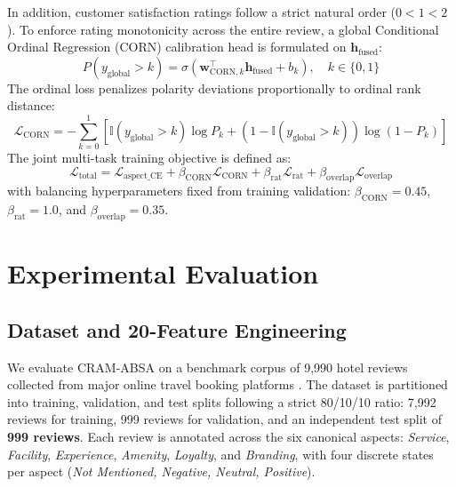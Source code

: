 \documentclass{llncs}
\begin{document}
In addition, customer satisfaction ratings follow a strict natural order ($0 < 1 < 2$). To enforce rating monotonicity across the entire review, a global Conditional Ordinal Regression (CORN) calibration head is formulated on $\mathbf{h}_{\text{fused}}$:
\begin{equation}
P(y_{\text{global}} > k) = \sigma(\mathbf{w}_{\text{CORN}, k}^\top \mathbf{h}_{\text{fused}} + b_k), \quad k \in \{0, 1\}
\end{equation}
The ordinal loss penalizes polarity deviations proportionally to ordinal rank distance:
\begin{equation}
\mathcal{L}_{\text{CORN}} = - \sum_{k=0}^{1} \left[ \mathbb{I}(y_{\text{global}} > k) \log P_k + (1 - \mathbb{I}(y_{\text{global}} > k)) \log (1 - P_k) \right]
\end{equation}
The joint multi-task training objective is defined as:
\begin{equation}
\mathcal{L}_{\text{total}} = \mathcal{L}_{\text{aspect\_CE}} + \beta_{\text{CORN}} \mathcal{L}_{\text{CORN}} + \beta_{\text{rat}} \mathcal{L}_{\text{rat}} + \beta_{\text{overlap}} \mathcal{L}_{\text{overlap}}
\end{equation}
with balancing hyperparameters fixed from training validation: $\beta_{\text{CORN}} = 0.45$, $\beta_{\text{rat}} = 1.0$, and $\beta_{\text{overlap}} = 0.35$.

\section{Experimental Evaluation}
\label{sec:experimental_evaluation}

\subsection{Dataset and 20-Feature Engineering}
\label{subsec:dataset_eda_features}
We evaluate CRAM-ABSA on a benchmark corpus of 9,990 hotel reviews collected from major online travel booking platforms \cite{ref10_nguyen2023,ref25_le2026}. The dataset is partitioned into training, validation, and test splits following a strict 80/10/10 ratio: 7,992 reviews for training, 999 reviews for validation, and an independent test split of \textbf{999 reviews}. Each review is annotated across the six canonical aspects: \textit{Service}, \textit{Facility}, \textit{Experience}, \textit{Amenity}, \textit{Loyalty}, and \textit{Branding}, with four discrete states per aspect (\textit{Not Mentioned, Negative, Neutral, Positive}).
\end{document}
